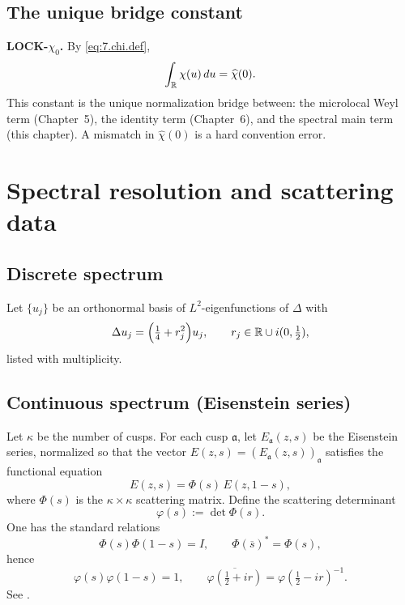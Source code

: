\subsection{The unique bridge constant}\label{subsec:ch7-chi0}

\noindent\textbf{LOCK-$\chi_0$.}
By \eqref{eq:7.chi.def},
\begin{equation}\label{eq:7.chi0}
\int_{\mathbb{R}}\chi(u)\,du=\widehat\chi(0).
\end{equation}
This constant is the unique normalization bridge between:
the microlocal Weyl term (Chapter~5), the identity term (Chapter~6), and the spectral main term (this chapter).
A mismatch in $\widehat\chi(0)$ is a hard convention error.

\section{Spectral resolution and scattering data}\label{sec:ch7-spectral}

\subsection{Discrete spectrum}\label{subsec:ch7-discrete}

Let $\{u_j\}$ be an orthonormal basis of $L^2$-eigenfunctions of $\Delta$ with
\begin{equation}\label{eq:7.eigs}
\Delta u_j=\Big(\tfrac14+r_j^2\Big)u_j,\qquad r_j\in\mathbb{R}\cup i(0,\tfrac12),
\end{equation}
listed with multiplicity.

\subsection{Continuous spectrum (Eisenstein series)}\label{subsec:ch7-continuous}

Let $\kappa$ be the number of cusps. For each cusp $\mathfrak a$, let $E_{\mathfrak a}(z,s)$ be the Eisenstein series,
normalized so that the vector $E(z,s)=(E_{\mathfrak a}(z,s))_{\mathfrak a}$ satisfies the functional equation
\begin{equation}\label{eq:7.eisenstein.functional}
E(z,s)=\Phi(s)\,E(z,1-s),
\end{equation}
where $\Phi(s)$ is the $\kappa\times\kappa$ scattering matrix.
Define the scattering determinant
\begin{equation}\label{eq:7.varphi.def}
\varphi(s):=\det\Phi(s).
\end{equation}
One has the standard relations
\begin{equation}\label{eq:7.varphi.sym}
\Phi(s)\Phi(1-s)=I,\qquad \Phi(\overline{s})^\ast=\Phi(s),
\end{equation}
hence
\begin{equation}\label{eq:7.varphi.sym2}
\varphi(s)\varphi(1-s)=1,
\qquad
\overline{\varphi(\tfrac12+ir)}=\varphi(\tfrac12-ir)^{-1}.
\end{equation}
See \cite{Hejhal1983,Iwaniec2002}.

